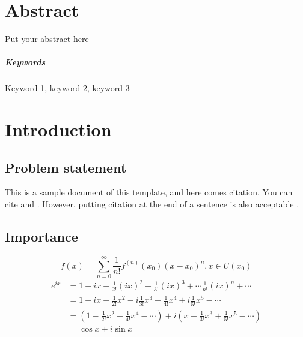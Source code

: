 \documentclass{senior-design}
\begin{document}
\generalreportcover %
\frontmatter
\chapter*{Abstract}
Put your abstract here

\paragraph{Keywords}
Keyword 1, keyword 2, keyword 3

\tableofcontents

\mainmatter
\chapter{Introduction}
\section{Problem statement}
This is a sample document of this template, and here comes citation. You can cite \cite{book1,paper1} and \cite{book2}. However, putting citation at the end of a sentence is also acceptable \cite{webpage1}.
\section{Importance}
\begin{equation}
    f\left( x \right) =\sum_{n=0}^{\infty}{\frac{1}{n!}f^{\left( n \right)}\left( x_0 \right) \left( x-x_0 \right) ^n}, x\in U\left( x_0 \right)
\end{equation}
\begin{equation}
    \begin{aligned}
    e^{ix}&=1+ix+\frac{1}{2!}\left( ix \right) ^2+\frac{1}{3!}\left( ix \right) ^3+\cdots \frac{1}{n!}\left( ix \right) ^n+\cdots
    \\
    &=1+ix-\frac{1}{2!}x^2-i\frac{1}{3!}x^3+\frac{1}{4!}x^4+i\frac{1}{5!}x^5-\cdots
    \\
    &=\left( 1-\frac{1}{2!}x^2+\frac{1}{4!}x^4-\cdots \right) +i\left( x-\frac{1}{3!}x^3+\frac{1}{5!}x^5-\cdots \right)
    \\
    &=\cos x+i\sin x
    \end{aligned}
\end{equation}
\end{document}
